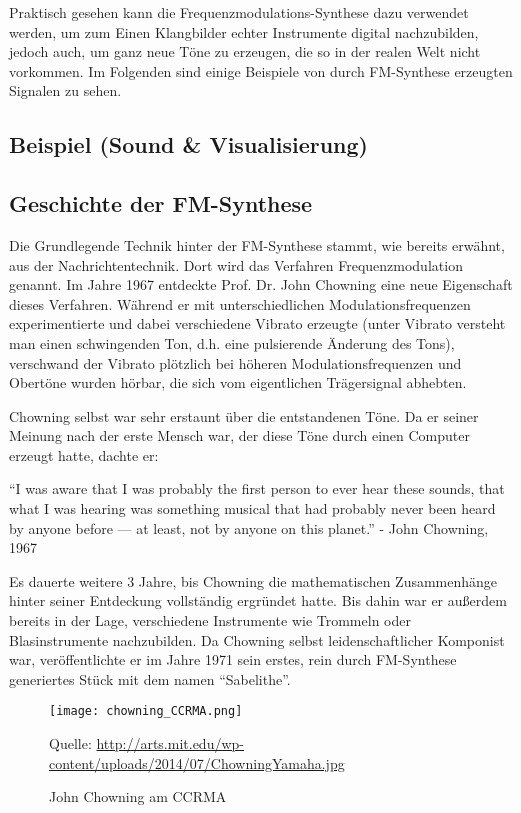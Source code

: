 Praktisch gesehen kann die Frequenzmodulations-Synthese dazu verwendet werden, um zum Einen Klangbilder echter Instrumente digital nachzubilden, jedoch auch, um ganz neue Töne zu erzeugen, die so in der realen Welt nicht vorkommen. Im Folgenden sind einige Beispiele von durch FM-Synthese erzeugten Signalen zu sehen.

\subsection{Beispiel (Sound \& Visualisierung)}
\subsection{Geschichte der FM-Synthese}
Die Grundlegende Technik hinter der FM-Synthese stammt, wie bereits erwähnt, aus der Nachrichtentechnik. Dort wird das Verfahren Frequenzmodulation genannt. Im Jahre 1967 entdeckte Prof. Dr. John Chowning eine neue Eigenschaft dieses Verfahren. Während er mit unterschiedlichen Modulationsfrequenzen experimentierte und dabei verschiedene Vibrato erzeugte (unter Vibrato versteht man einen schwingenden Ton, d.h. eine pulsierende Änderung des Tons), verschwand der Vibrato plötzlich bei höheren Modulationsfrequenzen und Obertöne wurden hörbar, die sich vom eigentlichen Trägersignal abhebten.

Chowning selbst war sehr erstaunt über die entstandenen Töne. Da er seiner Meinung nach der erste Mensch war, der diese Töne durch einen Computer erzeugt hatte, dachte er: 

``I was aware that I was probably the first person to ever hear these sounds, that what I was hearing was something musical that had probably never been heard by anyone before — at least, not by anyone on this planet.'' - John Chowning, 1967

Es dauerte weitere 3 Jahre, bis Chowning die mathematischen Zusammenhänge hinter seiner Entdeckung vollständig ergründet hatte. Bis dahin war er außerdem bereits in der Lage, verschiedene Instrumente wie Trommeln oder Blasinstrumente nachzubilden. Da Chowning selbst leidenschaftlicher Komponist war, veröffentlichte er im Jahre 1971 sein erstes, rein durch FM-Synthese generiertes Stück mit dem namen ``Sabelithe''. 
 
\begin{figure} [ht]
\centering
  \texttt{[image: chowning\_CCRMA.png]}
\caption{John Chowning am CCRMA}
Quelle: \url{http://arts.mit.edu/wp-content/uploads/2014/07/ChowningYamaha.jpg}
\end{figure}
 
